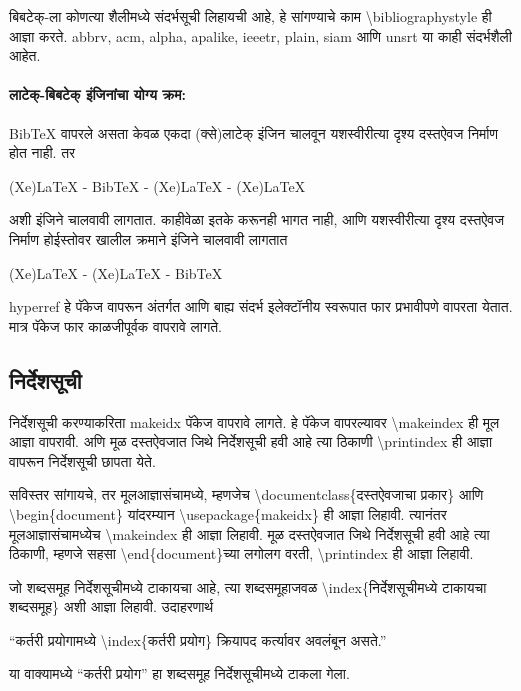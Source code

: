 \documentclass[11pt]{article}
\newcommand{\7}{\textbackslash}
\newcommand{\Syn}{\textenglish}
\begin{document}
बिबटेक्-ला कोणत्या शैलीमध्ये संदर्भसूची लिहायची आहे, हे सांगण्याचे काम 
\Syn{\7bibliographystyle} ही आज्ञा करते. \Syn{abbrv, acm, alpha,
 apalike, ieeetr, plain, siam} आणि \Syn{unsrt} या काही संदर्भशैली आहेत. 

\paragraph{लाटेक्-बिबटेक् इंजिनांचा योग्य क्रम:}

 {\Bask Bib\TeX} वापरले असता केवळ एकदा (क्से)लाटेक् इंजिन चालवून यशस्वीरीत्या दृश्य दस्तऐवज निर्माण होत नाही. तर
\begin{center}
 \Syn{(Xe)LaTeX - BibTeX - (Xe)LaTeX - (Xe)LaTeX }
\end{center}
 अशी इंजिने चालवावी लागतात. काहीवेळा इतके करूनही भागत नाही, आणि यशस्वीरीत्या दृश्य दस्तऐवज निर्माण होईस्तोवर खालील क्रमाने इंजिने चालवावी लागतात
 \begin{center}
 \Syn{(Xe)LaTeX - (Xe)LaTeX - BibTeX}
\end{center}

\medskip

\Syn{hyperref} हे पॅकेज वापरून अंतर्गत आणि बाह्य संदर्भ इलेक्टॉनीय स्वरूपात फार
प्रभावीपणे वापरता येतात. मात्र पॅकेज फार काळजीपूर्वक वापरावे लागते.

\subsection{निर्देशसूची}

निर्देशसूची करण्याकरिता \Syn{makeidx} \index{\Syn{makeidx} पॅकेज} पॅकेज वापरावे
लागते. हे पॅकेज वापरल्यावर \Syn{\7makeindex} \index{\Syn{\7makeindex}} ही मूल आज्ञा वापरावी. अणि मूळ दस्तऐवजात जिथे निर्देशसूची हवी आहे
त्या ठिकाणी \Syn{\7printindex} \index{\Syn{\7printindex}} ही आज्ञा वापरून
निर्देशसूची छापता येते.
\medskip

सविस्तर सांगायचे, तर मूलआज्ञासंचामध्ये, म्हणजेच
\Syn{\7documentclass}\{दस्तऐवजाचा प्रकार\} आणि \Syn{\7begin\{document\}}
यांदरम्यान \Syn{\7usepackage\{makeidx\}} ही आज्ञा लिहावी. त्यानंतर मूलआज्ञासंचामध्येच
\Syn{\7makeindex} ही आज्ञा लिहावी. मूळ दस्तऐवजात जिथे निर्देशसूची हवी आहे त्या
ठिकाणी, म्हणजे सहसा \Syn{\7end\{document\}}च्या लगोलग वरती,
\Syn{\7printindex} ही आज्ञा लिहावी.

जो शब्दसमूह निर्देशसूचीमध्ये टाकायचा आहे, त्या शब्दसमूहाजवळ \Syn{\7index}\{निर्देशसूचीमध्ये टाकायचा
 शब्दसमूह\} अशी आज्ञा लिहावी. उदाहरणार्थ
\begin{center}
 ``कर्तरी प्रयोगामध्ये \Syn{\7index}\{कर्तरी प्रयोग\} क्रियापद कर्त्यावर अवलंबून
 असते.''
\end{center}
या वाक्यामध्ये ``कर्तरी प्रयोग'' हा शब्दसमूह निर्देशसूचीमध्ये टाकला
गेला.
\medskip
\end{document}
